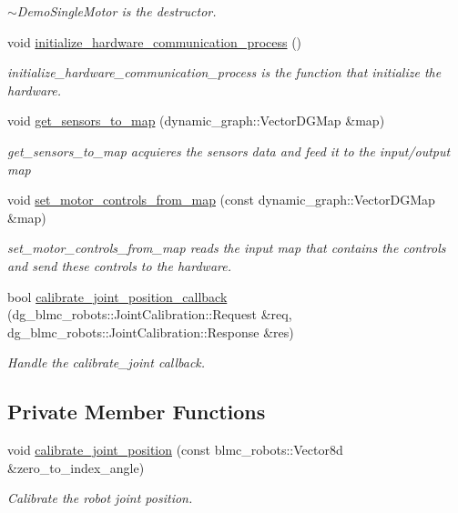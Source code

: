 \begin{DoxyCompactItemize}
\begin{DoxyCompactList}\small\item\em $\sim$\+Demo\+Single\+Motor is the destructor. \end{DoxyCompactList}\item 
void \hyperlink{classdg__blmc__robots_1_1DGMSolo8TI_a2a21728cb1b63fa63242514d09c2e7bf}{initialize\+\_\+hardware\+\_\+communication\+\_\+process} ()
\begin{DoxyCompactList}\small\item\em initialize\+\_\+hardware\+\_\+communication\+\_\+process is the function that initialize the hardware. \end{DoxyCompactList}\item 
void \hyperlink{classdg__blmc__robots_1_1DGMSolo8TI_afd126d69bc1d226c2666a4653e306b46}{get\+\_\+sensors\+\_\+to\+\_\+map} (dynamic\+\_\+graph\+::\+Vector\+D\+G\+Map \&map)
\begin{DoxyCompactList}\small\item\em get\+\_\+sensors\+\_\+to\+\_\+map acquieres the sensors data and feed it to the input/output map \end{DoxyCompactList}\item 
void \hyperlink{classdg__blmc__robots_1_1DGMSolo8TI_aef367ff385590dce6ca8fd4d8b10e813}{set\+\_\+motor\+\_\+controls\+\_\+from\+\_\+map} (const dynamic\+\_\+graph\+::\+Vector\+D\+G\+Map \&map)
\begin{DoxyCompactList}\small\item\em set\+\_\+motor\+\_\+controls\+\_\+from\+\_\+map reads the input map that contains the controls and send these controls to the hardware. \end{DoxyCompactList}\item 
bool \hyperlink{classdg__blmc__robots_1_1DGMSolo8TI_ab862135f110f2b497931892f6abbb879}{calibrate\+\_\+joint\+\_\+position\+\_\+callback} (dg\+\_\+blmc\+\_\+robots\+::\+Joint\+Calibration\+::\+Request \&req, dg\+\_\+blmc\+\_\+robots\+::\+Joint\+Calibration\+::\+Response \&res)
\begin{DoxyCompactList}\small\item\em Handle the calibrate\+\_\+joint callback. \end{DoxyCompactList}\end{DoxyCompactItemize}
\subsection*{Private Member Functions}
\begin{DoxyCompactItemize}
\item 
void \hyperlink{classdg__blmc__robots_1_1DGMSolo8TI_a9b4b07438fdce74f3875576ad8b38b9b}{calibrate\+\_\+joint\+\_\+position} (const blmc\+\_\+robots\+::\+Vector8d \&zero\+\_\+to\+\_\+index\+\_\+angle)
\begin{DoxyCompactList}\small\item\em Calibrate the robot joint position. \end{DoxyCompactList}\end{DoxyCompactItemize}

